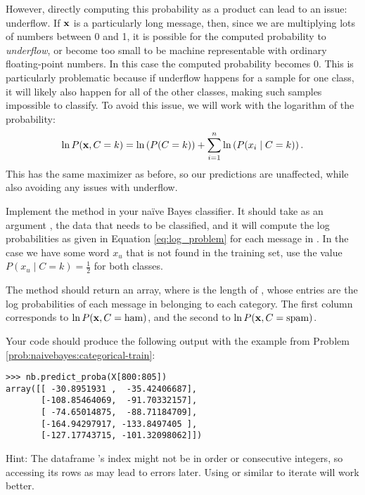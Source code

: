 However, directly computing this probability as a product can lead to an issue: underflow.
If $\mathbf{x}$ is a particularly long message, then, since we are multiplying lots of numbers between 0 and 1, it is possible for the computed probability to \emph{underflow}, or become too small to be machine representable with ordinary floating-point numbers.
In this case the computed probability becomes 0.
This is particularly problematic because if underflow happens for a sample for one class, it will likely also happen for all of the other classes, making such samples impossible to classify.
To avoid this issue, we will work with the logarithm of the probability:
\begin{equation}\label{eq:log_problem}
    \ln P(\mathbf{x},C=k)=\ln\left(P(C=k)\right) + \sum_{i=1}^{n}\ln\left(P(x_i \mid C=k)\right).
\end{equation}
This has the same maximizer as before, so our predictions are unaffected, while also avoiding any issues with underflow.

\begin{problem}\label{NB:prob_predict_proba}
Implement the  method in your naïve Bayes classifier. 
It should take as an argument , the data that needs to be classified, and it will compute the log probabilities as given in Equation \ref{eq:log_problem} for each message in .
In the case we have some word $x_u$ that is not found in the training set, use the value $P(x_u \mid C=k)=\frac{1}{2}$ for both classes.

The method should return an  array, where  is the length of , whose entries are the log probabilities of each message  in  belonging to each category.
The first column corresponds to $\ln P(\mathbf{x}, C=\text{ham})$, and the second to $\ln P(\mathbf{x}, C=\text{spam})$.

Your code should produce the following output with the example from Problem \ref{prob:naivebayes:categorical-train}:
\begin{lstlisting}
>>> nb.predict_proba(X[800:805])
array([[ -30.8951931 ,  -35.42406687],
       [-108.85464069,  -91.70332157],
       [ -74.65014875,  -88.71184709],
       [-164.94297917, -133.8497405 ],
       [-127.17743715, -101.32098062]])
\end{lstlisting}

Hint: The dataframe 's index might not be in order or consecutive integers, so accessing its rows as  may lead to errors later. Using  or similar to iterate will work better.
\end{problem}

